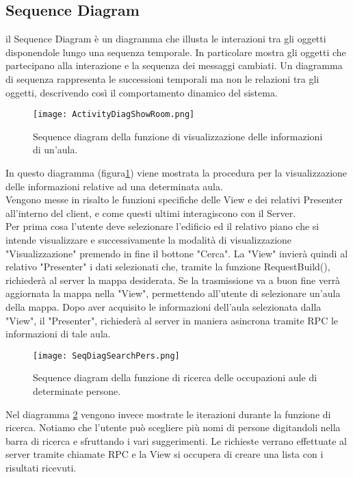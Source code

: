\FloatBarrier
\subsection{Sequence Diagram}
il Sequence Diagram è un diagramma che illusta le interazioni tra gli oggetti disponendole lungo una sequenza temporale. In particolare mostra gli oggetti che partecipano alla interazione e la sequenza dei messaggi cambiati.
Un diagramma di sequenza rappresenta le successioni temporali ma non le relazioni tra gli oggetti, descrivendo così il comportamento dinamico del sistema.
\begin{figure}[!htb]
\centering%
\texttt{[image: ActivityDiagShowRoom.png]}%
\caption{Sequence diagram della funzione di visualizzazione delle informazioni di un'aula.}\label{fig:umlSeqDRoomInfo}%
\end{figure}
\FloatBarrier
In questo diagramma (figura\ref{fig:umlSeqDRoomInfo}) viene mostrata la procedura per la visualizzazione delle informazioni relative ad una determinata aula. \\
Vengono messe in risalto le funzioni specifiche delle View e dei relativi Presenter all'interno del client, e come questi ultimi interagiscono con il Server.\\
Per prima cosa l'utente deve selezionare l'edificio ed il relativo piano che si intende visualizzare e successivamente la modalità di visualizzazione "Visualizzazione" premendo in fine il bottone "Cerca". La "View" invierà quindi al relativo "Presenter" i dati selezionati che, tramite la funzione RequestBuild(), richiederà al server la mappa desiderata. Se la trasmissione va a buon fine verrà aggiornata la mappa nella "View", permettendo all'utente di selezionare un'aula  della mappa. Dopo aver acquisito le informazioni dell'aula selezionata dalla "View", il "Presenter", richiederà al server in maniera asincrona tramite RPC le informazioni di tale aula.

\begin{figure}[!htb]
\centering%
\texttt{[image: SeqDiagSearchPers.png]}%
\caption{Sequence diagram della funzione di ricerca delle occupazioni aule di determinate persone.}\label{fig:umlSeqDSearchPerson}%
\end{figure}
\FloatBarrier
Nel diagramma \ref{fig:umlSeqDSearchPerson} vengono invece mostrate le iterazioni durante la funzione di ricerca. Notiamo che l'utente può scegliere più nomi di persone digitandoli nella barra di ricerca e sfruttando i vari suggerimenti. Le richieste verrano effettuate al server tramite chiamate RPC e la View si occupera di creare una lista con i risultati ricevuti.